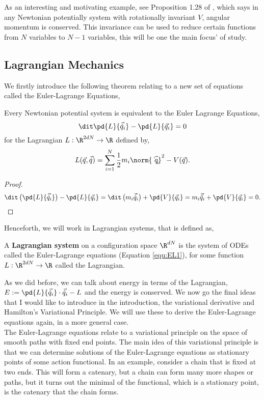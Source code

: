 \noindent
As an interesting and motivating example, see Proposition 1.28 of \cite{holm_schmah_stoica_2009}, which says in any Newtonian potentially system with rotationally invariant $V$, angular momentum is conserved. This invariance can be used to reduce certain functions from $N$ variables to $N - 1$ variables, this will be one the main focus' of study.

\subsection{Lagrangian Mechanics}
We firstly introduce the following theorem relating to a new set of equations called the Euler-Lagrange Equations,
\begin{nthm}
  Every Newtonian potential system is equivalent to the Euler Lagrange Equations,
  \begin{equation}
    \dit \pd{L}{\vec{\dot q}_i} - \pd{L}{\vec q_i} = 0 \label{equ:EL1}
  \end{equation}
  for the Lagrangian $L : \R^{2dN} \to \R$ defined by,
  $$ L(\vec q, \vec{\dot q}) = \sum_{i=1}^N \frac{1}{2}m_i\norm{\vec{\dot q_i}}^2 - V(\vec q). $$
\end{nthm}
\begin{proof}
  $$ \dit \left( \pd{L}{\vec{\dot q}_i} \right) - \pd{L}{\vec q_i} = \dit\left( m_i\vec{\dot q}_i \right) + \pd{V}{\vec q_i} =  m_i\vec{\ddot q}_i + \pd{V}{\vec q_i} = 0.$$
\end{proof}

\noindent
Henceforth, we will work in Lagrangian systems, that is defined as,
\begin{ndefi}
  A \textbf{Lagrangian system} on a configuration space $\R^{dN}$ is the system of ODEs called the Euler-Lagrange equations (Equation \ref{equ:EL1}), for some function $L : \R^{2dN} \to \R$ called the Lagrangian.
\end{ndefi}

\noindent
As we did before, we can talk about energy in terms of the Lagrangian, $E := \pd{L}{\vec{\dot q}_i} \cdot \vec{\dot q}_i - L$ and the energy is conserved. We now go the final ideas that I would like to introduce in the introduction, the variational derivative and Hamilton's Variational Principle. We will use these to derive the Euler-Lagrange equations again, in a more general case. \\

\noindent
The Euler-Lagrange equations relate to a variational principle on the space of smooth paths with fixed end points. The main idea of this variational principle is that we can determine solutions of the Euler-Lagrange equations as stationary points of some action functional. In an example, consider a chain that is fixed at two ends. This will form a catenary, but a chain can form many more shapes or paths, but it turns out the minimal of the functional, which is a stationary point, is the catenary that the chain forms.\\

